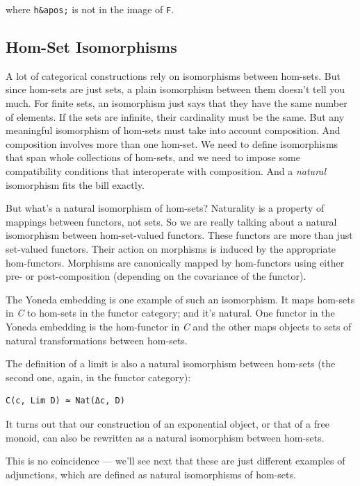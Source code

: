 where \texttt{h\&apos;} is not in the image of \texttt{F}.

\subsection{Hom-Set Isomorphisms}\label{hom-set-isomorphisms}

A lot of categorical constructions rely on isomorphisms between
hom-sets. But since hom-sets are just sets, a plain isomorphism between
them doesn't tell you much. For finite sets, an isomorphism just says
that they have the same number of elements. If the sets are infinite,
their cardinality must be the same. But any meaningful isomorphism of
hom-sets must take into account composition. And composition involves
more than one hom-set. We need to define isomorphisms that span whole
collections of hom-sets, and we need to impose some compatibility
conditions that interoperate with composition. And a \emph{natural}
isomorphism fits the bill exactly.

But what's a natural isomorphism of hom-sets? Naturality is a property
of mappings between functors, not sets. So we are really talking about a
natural isomorphism between hom-set-valued functors. These functors are
more than just set-valued functors. Their action on morphisms is induced
by the appropriate hom-functors. Morphisms are canonically mapped by
hom-functors using either pre- or post-composition (depending on the
covariance of the functor).

The Yoneda embedding is one example of such an isomorphism. It maps
hom-sets in \emph{C} to hom-sets in the functor category; and it's
natural. One functor in the Yoneda embedding is the hom-functor in
\emph{C} and the other maps objects to sets of natural transformations
between hom-sets.

The definition of a limit is also a natural isomorphism between hom-sets
(the second one, again, in the functor category):

\begin{verbatim}
C(c, Lim D) ≃ Nat(Δc, D)
\end{verbatim}

It turns out that our construction of an exponential object, or that of
a free monoid, can also be rewritten as a natural isomorphism between
hom-sets.

This is no coincidence --- we'll see next that these are just different
examples of adjunctions, which are defined as natural isomorphisms of
hom-sets.

